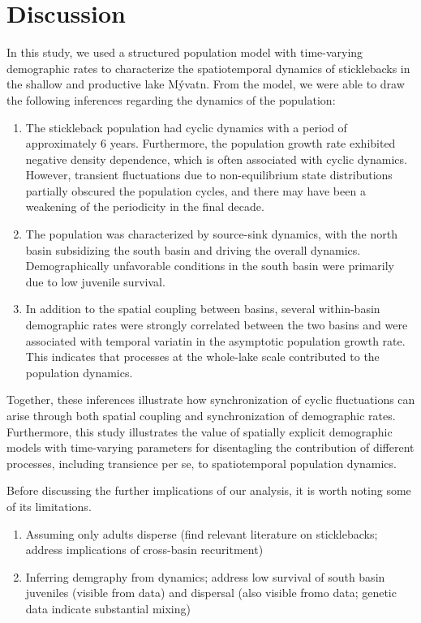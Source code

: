 

\section*{Discussion}

In this study, we used a structured population model 
with time-varying demographic rates to characterize the 
spatiotemporal dynamics of sticklebacks in the shallow and productive lake M\'{y}vatn.
From the model, we were able to draw the following inferences regarding the 
dynamics of the population:
%
\begin{enumerate}[label=(\alph*)]
\item
The stickleback population had cyclic dynamics with a period of approximately 6 years.
Furthermore, the population growth rate exhibited negative density dependence,
which is often associated with cyclic dynamics.
However, transient fluctuations due to non-equilibrium state distributions
partially obscured the population cycles,
and there may have been a weakening of the periodicity in the final decade.
%
\item
The population was characterized by source-sink dynamics, 
with the north basin subsidizing the south basin and driving the overall dynamics. 
Demographically unfavorable conditions in the south basin were 
primarily due to low juvenile survival.
%
\item
In addition to the spatial coupling between basins,
several within-basin demographic rates were strongly correlated 
between the two basins and 
were associated with temporal variatin in the asymptotic population growth rate.
This indicates that processes at the whole-lake scale contributed 
to the population dynamics.
\end{enumerate}
%
Together, these inferences illustrate how synchronization of cyclic fluctuations 
can arise through both spatial coupling and synchronization of demographic rates.
Furthermore, this study illustrates the value of spatially explicit demographic models 
with time-varying parameters for disentagling the contribution of different processes,
including transience per se, to spatiotemporal population dynamics.

Before discussing the further implications of our analysis, 
it is worth noting some of its limitations. 







\begin{enumerate}[label=(\alph*)]
\item
Assuming only adults disperse 
(find relevant literature on sticklebacks; address implications of cross-basin recuritment)
%
\item
Inferring demgraphy from dynamics; 
address low survival of south basin juveniles (visible from data) 
and dispersal (also visible fromo data; genetic data indicate substantial mixing)
\end{enumerate}

